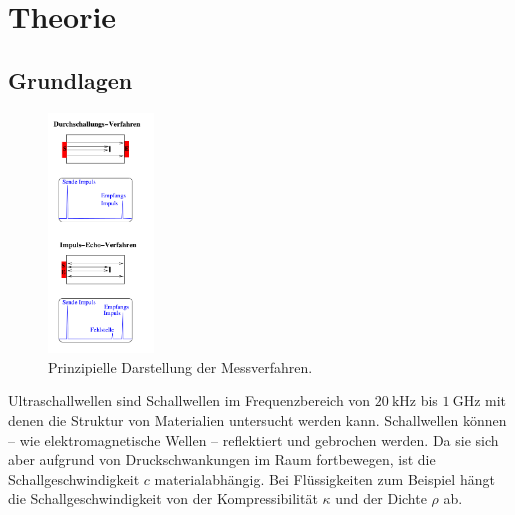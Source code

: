 \section{Theorie}
\label{sec:Theorie}
\subsection{Grundlagen}
\begin{figure}
	\centering
	\includegraphics[width=0.25\textwidth]{Bilder/Messverfahren.png}
	\caption{Prinzipielle Darstellung der Messverfahren. \cite{Anleitung}}
	\label{fig:echo}
\end{figure}
Ultraschallwellen sind Schallwellen im Frequenzbereich von $\SI{20}{\kilo\hertz}$ bis
$\SI{1}{\giga\hertz}$ mit denen die Struktur von Materialien untersucht werden kann.
Schallwellen können -- wie elektromagnetische Wellen -- reflektiert und gebrochen werden.
Da sie sich aber aufgrund von Druckschwankungen im Raum fortbewegen, ist die
Schallgeschwindigkeit $c$ materialabhängig. Bei Flüssigkeiten zum Beispiel hängt die
Schallgeschwindigkeit von der Kompressibilität $\kappa$ und der Dichte $\rho$ ab.

